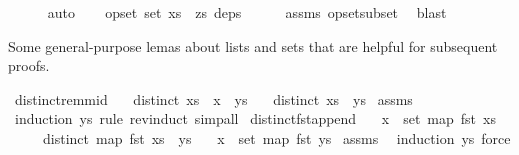 \begin{isabellebody}
\ \ \ \ \isamarkupfalse%
\ auto\isanewline
\ \ \isamarkupfalse%
\ {\isachardoublequoteopen}opset\ {\isacharparenleft}set\ {\isacharparenleft}xs\ {\isacharat}\ zs{\isacharparenright}{\isacharparenright}\ deps{\isachardoublequoteclose}\isanewline
\ \ \ \ \isamarkupfalse%
\ assms\ opset{\isacharunderscore}subset\ \isamarkupfalse%
\ blast\isanewline
{}\isamarkupfalse%
%
\endisatagproof
{\isafoldproof}%
%
\isadelimproof
%
\endisadelimproof
%
\isamarkuptrue%
%
\begin{isamarkuptext}%
Some general-purpose lemas about lists and sets that are helpful for
subsequent proofs.%
\end{isamarkuptext}\isamarkuptrue%
\isamarkupfalse%
\ distinct{\isacharunderscore}rem{\isacharunderscore}mid{\isacharcolon}\isanewline
\ \ \ {\isachardoublequoteopen}distinct\ {\isacharparenleft}xs\ {\isacharat}\ {\isacharbrackleft}x{\isacharbrackright}\ {\isacharat}\ ys{\isacharparenright}{\isachardoublequoteclose}\isanewline
\ \ \ {\isachardoublequoteopen}distinct\ {\isacharparenleft}xs\ {\isacharat}\ ys{\isacharparenright}{\isachardoublequoteclose}\isanewline
%
\isadelimproof
%
\endisadelimproof
%
\isatagproof
{}\isamarkupfalse%
\ assms\ \isamarkupfalse%
\ {\isacharparenleft}induction\ ys\ rule{\isacharcolon}\ rev{\isacharunderscore}induct{\isacharcomma}\ simp{\isacharunderscore}all{\isacharparenright}%
\endisatagproof
{\isafoldproof}%
%
\isadelimproof
\isanewline
%
\endisadelimproof
\isanewline
{}\isamarkupfalse%
\ distinct{\isacharunderscore}fst{\isacharunderscore}append{\isacharcolon}\isanewline
\ \ \ {\isachardoublequoteopen}x\ {\isasymin}\ set\ {\isacharparenleft}map\ fst\ xs{\isacharparenright}{\isachardoublequoteclose}\isanewline
\ \ \ \ \ {\isachardoublequoteopen}distinct\ {\isacharparenleft}map\ fst\ {\isacharparenleft}xs\ {\isacharat}\ ys{\isacharparenright}{\isacharparenright}{\isachardoublequoteclose}\isanewline
\ \ \ {\isachardoublequoteopen}x\ {\isasymnotin}\ set\ {\isacharparenleft}map\ fst\ ys{\isacharparenright}{\isachardoublequoteclose}\isanewline
%
\isadelimproof
%
\endisadelimproof
%
\isatagproof
{}\isamarkupfalse%
\ assms\ \isamarkupfalse%
\ {\isacharparenleft}induction\ ys{\isacharcomma}\ force{\isacharplus}{\isacharparenright}%
\endisatagproof
{\isafoldproof}%
%
\isadelimproof
\isanewline

\end{isabellebody}
